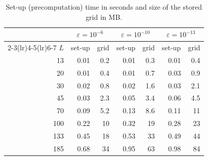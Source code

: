 \begin{table}[!htbp]\centering\small
\caption{Set-up (precomputation) time in seconds and size of the stored grid in MB.}\label{tab:setup}
\begin{tabular}{r rr rr rr}\toprule
&\multicolumn{2}{c}{$\varepsilon=10^{-6}$}&\multicolumn{2}{c}{$\varepsilon=10^{-10}$}&\multicolumn{2}{c}{$\varepsilon=10^{-13}$}\\
\cmidrule(lr){2-3}\cmidrule(lr){4-5}\cmidrule(lr){6-7}
$L$&set-up&grid&set-up&grid&set-up&grid\\\midrule
13 & 0.01 & 0.2 & 0.01 & 0.3 & 0.01 & 0.4\\
20 & 0.01 & 0.4 & 0.01 & 0.7 & 0.03 & 0.9\\
30 & 0.02 & 0.8 & 0.02 & 1.6 & 0.03 & 2.1\\
45 & 0.03 & 2.3 & 0.05 & 3.4 & 0.06 & 4.5\\
70 & 0.09 & 5.2 & 0.13 & 8.6 & 0.11 & 11\\
100 & 0.22 & 10 & 0.32 & 19 & 0.28 & 23\\
133 & 0.45 & 18 & 0.53 & 33 & 0.49 & 44\\
185 & 0.68 & 34 & 0.95 & 63 & 0.98 & 84\\
\bottomrule\end{tabular}\end{table}
